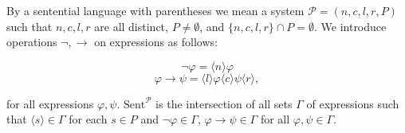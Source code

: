 By a sentential language with parentheses we mean a system $\mathcal{P} = (n, c, l, r, P)$ such that $n, c, l, r$ are all distinct, $P \neq \emptyset$, and $\{n, c, l, r\} \cap P = \emptyset$. We introduce operations $\neg, \rightarrow$ on expressions as follows:

$$\neg\varphi = \langle n \rangle\varphi$$
$$\varphi \rightarrow \psi = \langle l \rangle\varphi \langle c \rangle\psi \langle r \rangle,$$

for all expressions $\varphi, \psi$. $\text{Sent}^{\mathcal{P}}$ is the intersection of all sets $\Gamma$ of expressions such that $\langle s \rangle \in \Gamma$ for each $s \in P$ and $\neg\varphi \in \Gamma$, $\varphi \rightarrow \psi \in \Gamma$ for all $\varphi, \psi \in \Gamma$.
